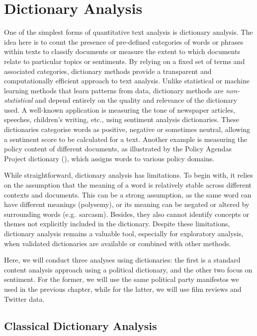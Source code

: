 \documentclass[
]{book}
\begin{document}
\chapter{Dictionary Analysis}\label{dictionary-analysis}

One of the simplest forms of quantitative text analysis is dictionary analysis. The idea here is to count the presence of pre-defined categories of words or phrases within texts to classify documents or measure the extent to which documents relate to particular topics or sentiments. By relying on a fixed set of terms and associated categories, dictionary methods provide a transparent and computationally efficient approach to text analysis. Unlike statistical or machine learning methods that learn patterns from data, dictionary methods are \emph{non-statistical} and depend entirely on the quality and relevance of the dictionary used. A well-known application is measuring the tone of newspaper articles, speeches, children's writing, etc., using sentiment analysis dictionaries. These dictionaries categorise words as positive, negative or sometimes neutral, allowing a sentiment score to be calculated for a text. Another example is measuring the policy content of different documents, as illustrated by the Policy Agendas Project dictionary (), which assigns words to various policy domains.

While straightforward, dictionary analysis has limitations. To begin with, it relies on the assumption that the meaning of a word is relatively stable across different contexts and documents. This can be a strong assumption, as the same word can have different meanings (polysemy), or its meaning can be negated or altered by surrounding words (e.g.~sarcasm). Besides, they also cannot identify concepts or themes not explicitly included in the dictionary. Despite these limitations, dictionary analysis remains a valuable tool, especially for exploratory analysis, when validated dictionaries are available or combined with other methods.

Here, we will conduct three analyses using dictionaries: the first is a standard content analysis approach using a political dictionary, and the other two focus on sentiment. For the former, we will use the same political party manifestos we used in the previous chapter, while for the latter, we will use film reviews and Twitter data.

\section{Classical Dictionary Analysis}\label{classical-dictionary-analysis}
\end{document}
